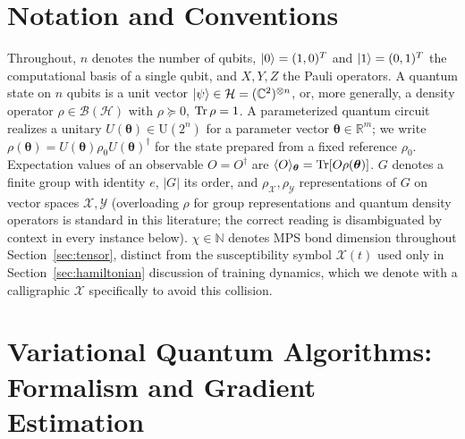 \documentclass[11pt]{article}
\begin{document}
\section{Notation and Conventions}
\label{sec:notation}
Throughout, $n$ denotes the number of qubits, $\ket{0}=(1,0)^T$ and $\ket{1}=(0,1)^T$ the computational basis of a single qubit, and $X,Y,Z$ the Pauli operators. A quantum state on $n$ qubits is a unit vector $\ket{\psi}\in\mathcal{H}=(\mathbb{C}^2)^{\otimes n}$, or, more generally, a density operator $\rho\in\mathcal{B}(\mathcal{H})$ with $\rho\succeq 0$, $\Tr\rho=1$. A parameterized quantum circuit realizes a unitary $U(\bm{\theta})\in\mathrm{U}(2^n)$ for a parameter vector $\bm{\theta}\in\mathbb{R}^{m}$; we write $\rho(\bm{\theta})=U(\bm{\theta})\rho_0 U(\bm{\theta})^\dagger$ for the state prepared from a fixed reference $\rho_0$. Expectation values of an observable $O=O^\dagger$ are $\langle O\rangle_{\bm{\theta}} = \Tr[O\rho(\bm{\theta})]$. $G$ denotes a finite group with identity $e$, $|G|$ its order, and $\rho_{\mathcal{X}},\rho_{\mathcal{Y}}$ representations of $G$ on vector spaces $\mathcal{X},\mathcal{Y}$ (overloading $\rho$ for group representations and quantum density operators is standard in this literature; the correct reading is disambiguated by context in every instance below). $\chi\in\mathbb{N}$ denotes MPS bond dimension throughout Section~\ref{sec:tensor}, distinct from the susceptibility symbol $\mathcal{X}(t)$ used only in Section~\ref{sec:hamiltonian} discussion of training dynamics, which we denote with a calligraphic $\mathcal{X}$ specifically to avoid this collision.

\section{Variational Quantum Algorithms: Formalism and Gradient Estimation}
\label{sec:vqa}
\end{document}
